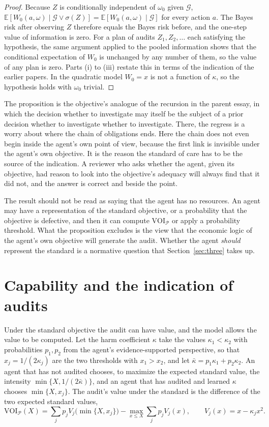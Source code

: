 \documentclass[11pt]{article}
\newcommand{\G}{\mathcal G}
\newcommand{\E}{\mathbb E}
\newcommand{\VOI}{\mathrm{VOI}}
\theoremstyle{plain}
\theoremstyle{definition}
\begin{document}
\begin{proof}
Because $Z$ is conditionally independent of $\omega_0$ given $\G$, $\E[W_0(a,\omega)\mid\G\vee\sigma(Z)]=\E[W_0(a,\omega)\mid\G]$ for every action $a$. The Bayes risk after observing $Z$ therefore equals the Bayes risk before, and the one-step value of information is zero. For a plan of audits $Z_1,Z_2,\dots$ each satisfying the hypothesis, the same argument applied to the pooled information shows that the conditional expectation of $W_0$ is unchanged by any number of them, so the value of any plan is zero. Parts (i) to (iii) restate this in terms of the indication of the earlier papers. In the quadratic model $W_0=x$ is not a function of $\kappa$, so the hypothesis holds with $\omega_0$ trivial.
\end{proof}

The proposition is the objective's analogue of the recursion in the parent essay, in which the decision whether to investigate may itself be the subject of a prior decision whether to investigate whether to investigate. There, the regress is a worry about where the chain of obligations ends. Here the chain does not even begin inside the agent's own point of view, because the first link is invisible under the agent's own objective. It is the reason the standard of care has to be the source of the indication. A reviewer who asks whether the agent, given its objective, had reason to look into the objective's adequacy will always find that it did not, and the answer is correct and beside the point.

The result should not be read as saying that the agent has no resources. An agent may have a representation of the standard objective, or a probability that the objective is defective, and then it can compute $\VOI_{\mathcal P}$ or apply a probability threshold. What the proposition excludes is the view that the economic logic of the agent's own objective will generate the audit. Whether the agent \emph{should} represent the standard is a normative question that Section~\ref{sec:three} takes up.

\section{Capability and the indication of audits}\label{sec:capability}

Under the standard objective the audit can have value, and the model allows the value to be computed. Let the harm coefficient $\kappa$ take the values $\kappa_1<\kappa_2$ with probabilities $p_1,p_2$ from the agent's evidence-supported perspective, so that $x_j=1/(2\kappa_j)$ are the two thresholds with $x_1>x_2$, and let $\bar\kappa=p_1\kappa_1+p_2\kappa_2$. An agent that has not audited chooses, to maximize the expected standard value, the intensity $\min\{X,1/(2\bar\kappa)\}$, and an agent that has audited and learned $\kappa$ chooses $\min\{X,x_j\}$. The audit's value under the standard is the difference of the two expected standard values,
\[
\VOI_{\mathcal P}(X)=\sum_jp_jV_j\bigl(\min\{X,x_j\}\bigr)-\max_{x\le X}\sum_jp_jV_j(x),\qquad V_j(x)=x-\kappa_jx^2.
\]
\end{document}
